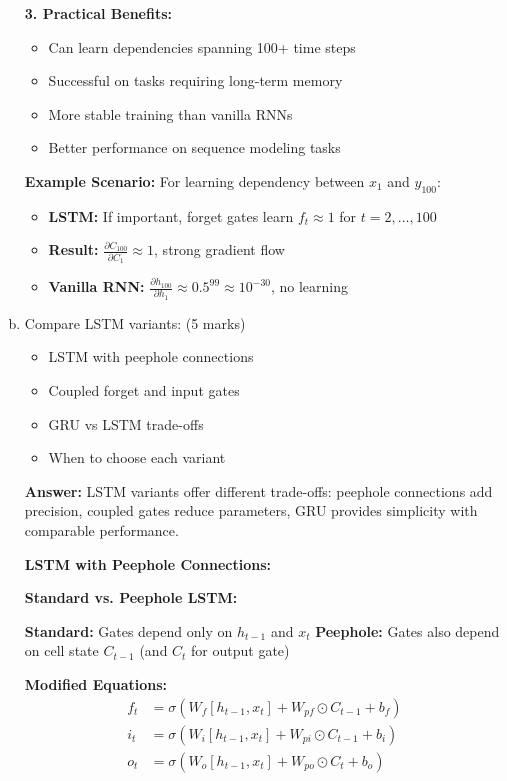 \documentclass[12pt]{article}
\newcommand{\answer}[1]{{\color{answercolor}\textbf{Answer:} #1}}
\newcommand{\explanation}[1]{{\color{explanationcolor}#1}}
\begin{document}
\begin{enumerate}[(a)]
{    \textbf{3. Practical Benefits:}
    \begin{itemize}
        \item Can learn dependencies spanning 100+ time steps
        \item Successful on tasks requiring long-term memory
        \item More stable training than vanilla RNNs
        \item Better performance on sequence modeling tasks
    \end{itemize}
    
    \textbf{Example Scenario:}
    For learning dependency between $x_1$ and $y_{100}$:
    \begin{itemize}
        \item \textbf{LSTM:} If important, forget gates learn $f_t \approx 1$ for $t = 2, \ldots, 100$
        \item \textbf{Result:} $\frac{\partial C_{100}}{\partial C_1} \approx 1$, strong gradient flow
        \item \textbf{Vanilla RNN:} $\frac{\partial h_{100}}{\partial h_1} \approx 0.5^{99} \approx 10^{-30}$, no learning
    \end{itemize}
    }
    
    \item Compare LSTM variants: \hfill (5 marks)
    \begin{itemize}
        \item LSTM with peephole connections
        \item Coupled forget and input gates
        \item GRU vs LSTM trade-offs
        \item When to choose each variant
    \end{itemize}
    
    \answer{LSTM variants offer different trade-offs: peephole connections add precision, coupled gates reduce parameters, GRU provides simplicity with comparable performance.}
    
    \explanation{
    \textbf{LSTM with Peephole Connections:}
    
    \textbf{Standard vs. Peephole LSTM:}
    
    \textbf{Standard:} Gates depend only on $h_{t-1}$ and $x_t$
    \textbf{Peephole:} Gates also depend on cell state $C_{t-1}$ (and $C_t$ for output gate)
    
    \textbf{Modified Equations:}
    \begin{align}
    f_t &= \sigma(W_f [h_{t-1}, x_t] + W_{pf} \odot C_{t-1} + b_f) \\
    i_t &= \sigma(W_i [h_{t-1}, x_t] + W_{pi} \odot C_{t-1} + b_i) \\
    o_t &= \sigma(W_o [h_{t-1}, x_t] + W_{po} \odot C_t + b_o)
    \end{align}
    
}
\end{enumerate}
\end{document}
